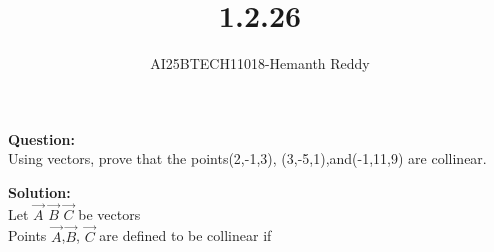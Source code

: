 \documentclass[journal]{IEEEtran}
\begin{document}

\vspace{3cm}

\title{1.2.26}
\author{AI25BTECH11018-Hemanth Reddy}
 \maketitle
{\let\newpage\relax\maketitle}

\renewcommand{\thefigure}{\theenumi}
\renewcommand{\thetable}{\theenumi}
\setlength{\intextsep}{10pt} %


\renewcommand{\thetable}{\theenumi}

\textbf{Question:}\\
Using vectors, prove that the points(2,-1,3), (3,-5,1),and(-1,11,9) are collinear.


\textbf{Solution:}\\
Let $\vec{A}$   $\vec{B}$    $\vec{C}$ be vectors \\
Points $\vec{A}$,$\vec{B}$, $\vec{C}$ are defined to be collinear if\\
\end{document}
